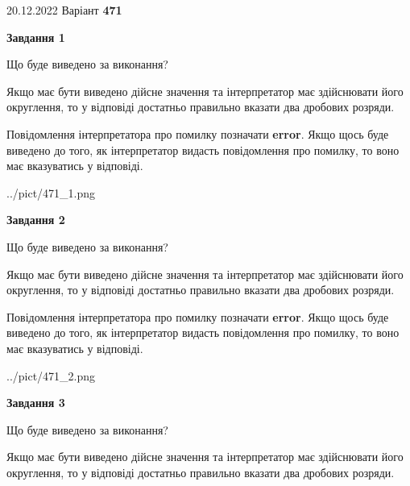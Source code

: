 \documentclass[12pt, ukrainian]{article}
\begin{document}
{20.12.2022 Варіант \No \textbf { 471 }\par}
{
\begin {Large}

{\begin {center}\textbf{Завдання 1}\end {center}}\par
Що буде виведено за виконання? \par

Якщо має бути виведено дійсне значення та інтерпретатор має здійснювати його округлення, 
то у відповіді достатньо правильно вказати два дробових розряди.

Повідомлення інтерпретатора про помилку позначати \textbf{error}.
Якщо щось буде виведено до того, як інтерпретатор видасть повідомлення про помилку, 
то воно має вказуватись у відповіді. \par

\begin{center}
	{../pict/471_1.png}
\end{center}
\newpage

{\begin {center}\textbf{Завдання 2}\end {center}}\par
Що буде виведено за виконання? \par

Якщо має бути виведено дійсне значення та інтерпретатор має здійснювати його округлення, 
то у відповіді достатньо правильно вказати два дробових розряди.

Повідомлення інтерпретатора про помилку позначати \textbf{error}.
Якщо щось буде виведено до того, як інтерпретатор видасть повідомлення про помилку, 
то воно має вказуватись у відповіді. \par

\begin{center}
	{../pict/471_2.png}
\end{center}
\newpage

{\begin {center}\textbf{Завдання 3}\end {center}}\par
Що буде виведено за виконання? \par

Якщо має бути виведено дійсне значення та інтерпретатор має здійснювати його округлення, 
то у відповіді достатньо правильно вказати два дробових розряди.


\end{Large}}
\end{document}
